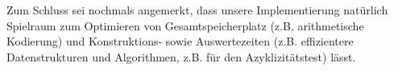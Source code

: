 \documentclass[a4paper,12pt,twoside]{report}
\begin{document}
Zum Schluss sei nochmals angemerkt, dass unsere Implementierung natürlich Spielraum zum Optimieren von Gesamtspeicherplatz (z.B. arithmetische Kodierung) und Konstruktions- sowie Auswertezeiten (z.B. effizientere Datenstrukturen und Algorithmen, z.B. für den Azyklizitätstest) lässt.

\cleardoublepage
{}


\end{document}
